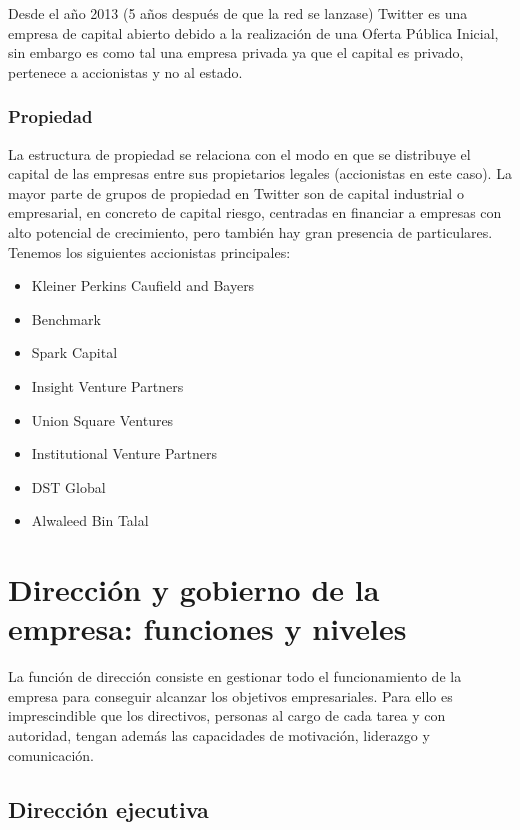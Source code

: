 Desde el año 2013 (5 años después de que la red se lanzase) Twitter es una empresa de capital abierto debido a la realización de una Oferta Pública Inicial, sin embargo es como tal una empresa privada ya que el capital es privado, pertenece a accionistas y no al estado.

\subsubsection{Propiedad}

La estructura de propiedad se relaciona con el modo en que se distribuye el capital de las empresas entre sus propietarios legales (accionistas en este caso). La mayor parte de grupos de propiedad en Twitter son de capital industrial o empresarial, en concreto de capital riesgo, centradas en financiar a empresas con alto potencial de crecimiento, pero también hay gran presencia de particulares. Tenemos los siguientes accionistas principales:

\begin{itemize}

\item Kleiner Perkins Caufield and Bayers
\item Benchmark
\item Spark Capital
\item Insight Venture Partners
\item Union Square Ventures
\item Institutional Venture Partners
\item DST Global
\item Alwaleed Bin Talal

\end{itemize}

\section{Dirección y gobierno de la empresa: funciones y niveles}

La función de dirección consiste en gestionar todo el funcionamiento de la empresa para conseguir alcanzar los objetivos empresariales. Para ello es imprescindible que los directivos, personas al cargo de cada tarea y con autoridad, tengan además las capacidades de motivación, liderazgo y comunicación.

\subsection{Dirección ejecutiva}

